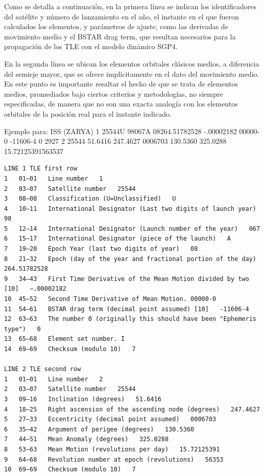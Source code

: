 Como se detalla a continuación, en la primera línea se indican los identificadores del satélite y número de lanzamiento en el año, el instante en el que fueron calculados los elementos, y parámetros de ajuste, como las derivadas de movimiento medio y el BSTAR drag term, que resultan necesarios para la propagación de los TLE con el modelo dinámico SGP4.

En la segunda línea se ubican los elementos orbitales clásicos medios, a diferencia del semieje mayor, que se ofrece implícitamente en el dato del movimiento medio. En este punto es importante resaltar el hecho de que se trata de elementos medios, promediados bajo ciertos criterios y metodologías, no siempre especificadas, de manera que no son una exacta analogía con los elementos orbitales de la posición real para el instante indicado.


Ejemplo para: ISS (ZARYA)
1 25544U 98067A   08264.51782528 -.00002182  00000-0 -11606-4 0  2927
2 25544  51.6416 247.4627 0006703 130.5360 325.0288 15.72125391563537


\begin{verbatim} 
LINE 1 TLE first row
1   01–01   Line number   1
2   03–07   Satellite number   25544
3   08–08   Classification (U=Unclassified)   U
4   10–11   International Designator (Last two digits of launch year)   98
5   12–14   International Designator (Launch number of the year)   067
6   15–17   International Designator (piece of the launch)   A
7   19–20   Epoch Year (last two digits of year)   08
8   21–32   Epoch (day of the year and fractional portion of the day)   264.51782528
9   34–43   First Time Derivative of the Mean Motion divided by two [10]   −.00002182
10  45–52   Second Time Derivative of Mean Motion. 00000-0
11  54–61   BSTAR drag term (decimal point assumed) [10]   -11606-4
12  63–63   The number 0 (originally this should have been "Ephemeris type")   0
13  65–68   Element set number. I
14  69–69   Checksum (modulo 10)   7

LINE 2 TLE second row
1   01–01   Line number   2
2   03–07   Satellite number   25544
3   09–16   Inclination (degrees)   51.6416
4   18–25   Right ascension of the ascending node (degrees)   247.4627
5   27–33   Eccentricity (decimal point assumed)   0006703
6   35–42   Argument of perigee (degrees)   130.5360
7   44–51   Mean Anomaly (degrees)   325.0288
8   53–63   Mean Motion (revolutions per day)   15.72125391
9   64–68   Revolution number at epoch (revolutions)   56353
10  69–69   Checksum (modulo 10)   7
\end{verbatim}

